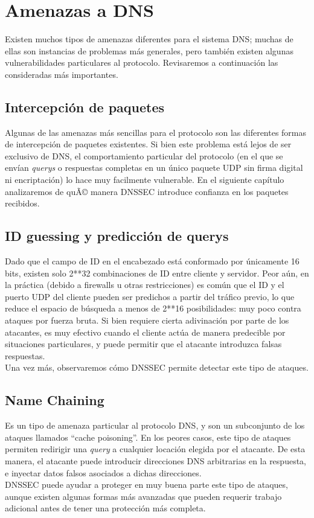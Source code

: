 \chapter{Amenazas a DNS}
Existen muchos tipos de amenazas diferentes para el sistema DNS; muchas de ellas son instancias de problemas m\'as generales, pero tambi\'en existen algunas vulnerabilidades particulares al protocolo. Revisaremos a continuaci\'on las consideradas m\'as importantes\cite{rfc3833}.
\section{Intercepci\'on de paquetes}
Algunas de las amenazas m\'as sencillas para el protocolo son las diferentes formas de intercepci\'on de paquetes existentes. Si bien este problema est\'a lejos de ser exclusivo de DNS, el comportamiento particular del protocolo (en el que se env\'ian \textit{querys} o respuestas completas en un \'unico paquete UDP sin firma digital ni encriptaci\'on) lo hace muy facilmente vulnerable. En el siguiente cap\'itulo analizaremos de quÃ© manera DNSSEC introduce confianza en los paquetes recibidos.
\section{ID guessing y predicci\'on de querys}
Dado que el campo de ID en el encabezado est\'a conformado por \'unicamente 16 bits, existen solo 2**32 combinaciones de ID entre cliente y servidor. Peor a\'un, en la pr\'actica (debido a firewalls u otras restricciones) es com\'un que el ID y el puerto UDP del cliente pueden ser predichos a partir del tr\'afico previo, lo que reduce el espacio de b\'usqueda a menos de 2**16 posibilidades: muy poco contra ataques por fuerza bruta. Si bien requiere cierta adivinaci\'on por parte de los atacantes, es muy efectivo cuando el cliente act\'ua de manera predecible por situaciones particulares, y puede permitir que el atacante introduzca falsas respuestas.\\
Una vez m\'as, observaremos c\'omo DNSSEC permite detectar este tipo de ataques.
\section{Name Chaining}
Es un tipo de amenaza particular al protocolo DNS, y son un subconjunto de los ataques llamados ``cache poisoning''. En los peores casos, este tipo de ataques permiten redirigir una \textit{query} a cualquier locaci\'on elegida por el atacante. De esta manera, el atacante puede introducir direcciones DNS arbitrarias en la respuesta, e inyectar datos falsos asociados a dichas direcciones.\\
DNSSEC puede ayudar a proteger en muy buena parte este tipo de ataques, aunque existen algunas formas m\'as avanzadas que pueden requerir trabajo adicional antes de tener una protecci\'on m\'as completa.
